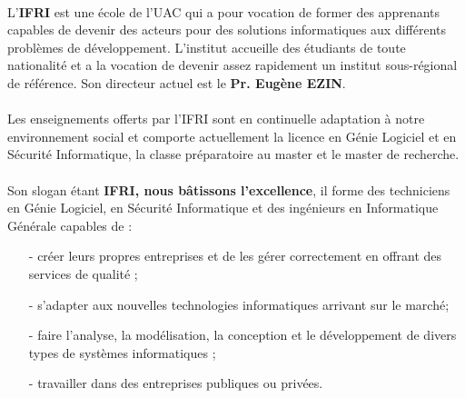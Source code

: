 \documentclass[12pt]{report}
\begin{document}
      \paragraph{}
	L’\textbf{\gls{IFRI}} est une école de l'\gls{UAC} qui a pour vocation de former des apprenants capables de devenir des acteurs pour des solutions informatiques aux différents problèmes de développement. L’institut accueille des étudiants de toute nationalité et a la vocation de devenir assez rapidement un institut sous-régional de référence. Son directeur actuel est le \textbf{Pr. Eugène EZIN}.
      \paragraph{}
	Les enseignements offerts par l’\gls{IFRI} sont en continuelle adaptation à notre environnement social et comporte actuellement la licence en Génie Logiciel et en Sécurité Informatique, la classe préparatoire au master et le master de recherche.
      \paragraph{}
	Son slogan étant \textbf{ \gls{IFRI}, nous bâtissons l’excellence}, il forme des techniciens en Génie Logiciel, en Sécurité Informatique et des ingénieurs en Informatique Générale capables de :
	\begin{itemize}
	  \item[-] créer leurs propres entreprises et de les gérer correctement en offrant des services de qualité ;
	  \item[-] s'adapter aux nouvelles technologies informatiques arrivant sur le marché;
	  \item[-] faire l'analyse, la modélisation, la conception et le développement de divers types de systèmes informatiques ;
	  \item[-] travailler dans des entreprises publiques ou privées.
	\end{itemize}
      
\end{document}
